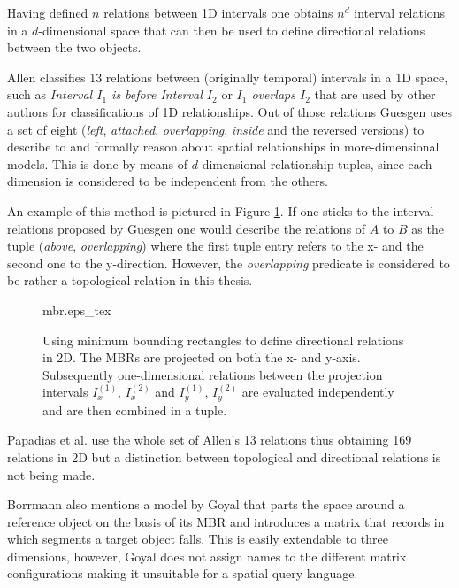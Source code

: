 \documentclass[paper=a4, fontsize=11pt]{scrartcl} %
\numberwithin{equation}{section} %
\numberwithin{figure}{section} %
\numberwithin{table}{section} %
\begin{document}
Having defined $n$ relations between 1D intervals one obtains $n^d$ interval relations in a $d$-dimensional space that can then be used to define directional relations between the two objects. 

Allen \cite{Allen:1983:MKT:182.358434} classifies 13 relations between (originally temporal) intervals in a 1D space, such as \textit{Interval $I_1$ is before Interval $I_2$} or \textit{$I_1$ overlaps $I_2$} that are used by other authors for classifications of 1D relationships. Out of those relations Guesgen \cite{guesgen1989spatial} uses a set of eight (\emph{left}, \emph{attached}, \emph{overlapping}, \emph{inside} and the reversed versions) to describe to and formally reason about spatial relationships in more-dimensional models. This is done by means of $d$-dimensional relationship tuples, since each dimension is considered to be independent from the others. 

An example of this method is pictured in Figure \ref{fig:mbr}. If one sticks to the interval relations proposed by Guesgen one would describe the relations of $A$ to $B$ as the tuple (\emph{above}, \emph{overlapping}) where the first tuple entry refers to the x- and the second one to the y-direction. However, the \emph{overlapping} predicate is considered to be rather a topological relation in this thesis. 

\begin{figure}
  \centering
  \def\svgwidth{20em}
  {mbr.eps_tex}
  \caption{Using minimum bounding rectangles to define directional relations in 2D. The MBRs are projected on both the x- and y-axis. Subsequently one-dimensional relations between the projection intervals $I^{(1)}_x$, $I^{(2)}_x$  and $I^{(1)}_y$, $I^{(2)}_y$ are evaluated independently and are then combined in a tuple.}
  \label{fig:mbr}
\end{figure}

Papadias et al. \cite{papadias1995topological} use the whole set of Allen's 13 relations thus obtaining 169 relations in 2D but a distinction between topological and directional relations is not being made. 

Borrmann also mentions a model by Goyal \cite{goyal2000similarity} that parts the space around a reference object on the basis of its MBR and introduces a matrix that records in which segments a target object falls. This is easily extendable to three dimensions, however, Goyal does not assign names to the different matrix configurations making it unsuitable for a spatial query language.  
\end{document}
